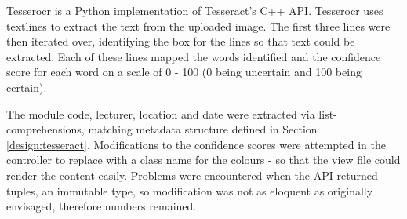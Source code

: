 {{{{{{{Tesserocr is a Python implementation of Tesseract's  C++ API. Tesserocr uses textlines to extract the text from the uploaded image. The first three lines were then iterated over, identifying the box for the lines so that text could be extracted. Each of these lines mapped the words identified and the confidence score for each word on a scale of 0 - 100 (0 being uncertain and 100 being certain).

The module code, lecturer, location and date were extracted via list-comprehensions, matching metadata structure defined in Section \ref{design:tesseract}. Modifications to the confidence scores were attempted in the controller to replace with a class name for the colours - so that the view file could render the content easily. Problems were encountered when the API returned tuples, an immutable type, so modification was not as eloquent as originally envisaged, therefore numbers remained.

}}}}}}}
